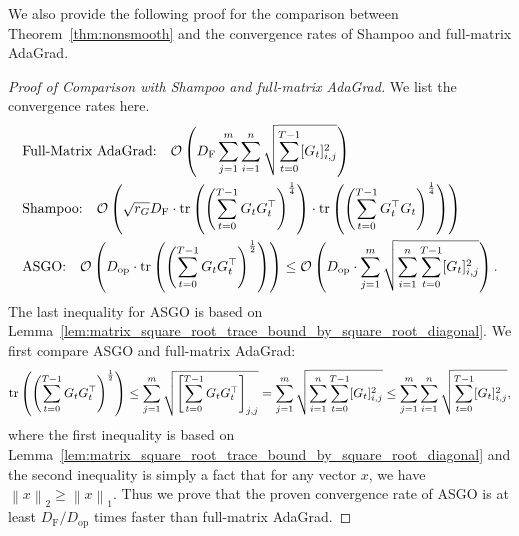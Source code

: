 \documentclass{article}
\theoremstyle{remark}
\newcommand{\Norm}[1]{\left\|#1\right\|}
\newcommand{\tr}[1]{{\rm tr}\left( #1 \right)}
\newcommand{\cO}{\mathcal{O}}
\begin{document}
We also provide the following proof for the comparison between Theorem~\ref{thm:nonsmooth} and the convergence rates of Shampoo and full-matrix AdaGrad.
\begin{proof}[Proof of Comparison with Shampoo and full-matrix AdaGrad]
    We list the convergence rates here.
    \begin{align*}
    &\text{Full-Matrix AdaGrad:} \quad \cO\left( D_{\mathrm{F}} \sum_{j=1}^{m} \sum_{i=1}^n \sqrt{\sum_{t=0}^{T-1} [G_{t}]_{i,j}^2} \right) \\
    &\text{Shampoo:} \quad \cO\left( \sqrt{r_G} D_{\mathrm{F}} \cdot \tr{\left( \sum_{t=0}^{T-1} G_t G_t^\top \right)^{\frac{1}{4}}} \cdot \tr{\left( \sum_{t=0}^{T-1} G_t^{\top} G_t \right)^{\frac{1}{4}}} \right) \\
    &\text{ASGO:} \quad \cO\left( D_{\mathrm{op}} \cdot \tr{\left( \sum_{t=0}^{T-1} G_t G_t^\top \right)^{\frac{1}{2}}} \right) \le \cO\left( D_{\mathrm{op}} \cdot \sum_{j=1}^m \sqrt{\sum_{i=1}^n \sum_{t=0}^{T-1} [G_t]_{i,j}^2} \right).
    \end{align*}
The last inequality for ASGO is based on Lemma~\ref{lem:matrix_square_root_trace_bound_by_square_root_diagonal}.
We first compare ASGO and full-matrix AdaGrad:
\begin{align*}
    \tr{\left( \sum_{t=0}^{T-1} G_t G_t^\top \right)^{\frac{1}{2}}} \le \sum_{j=1}^m \sqrt{\left[ \sum_{t=0}^{T-1} G_t G_t^\top \right]_{j,j}} = \sum_{j=1}^m \sqrt{\sum_{i=1}^n \sum_{t=0}^{T-1} [G_t]_{i,j}^2} \le \sum_{j=1}^{m} \sum_{i=1}^n \sqrt{\sum_{t=0}^{T-1} [G_{t}]_{i,j}^2} ,
\end{align*}
where the first inequality is based on Lemma~\ref{lem:matrix_square_root_trace_bound_by_square_root_diagonal} and the second inequality is simply a fact that for any vector $x$, we have $\Norm{x}_2 \ge \Norm{x}_1$. Thus we prove that the proven convergence rate of ASGO is at least $D_{\mathrm{F}}/ D_{\mathrm{op}}$ times faster than full-matrix AdaGrad.


\end{proof}
\end{document}
